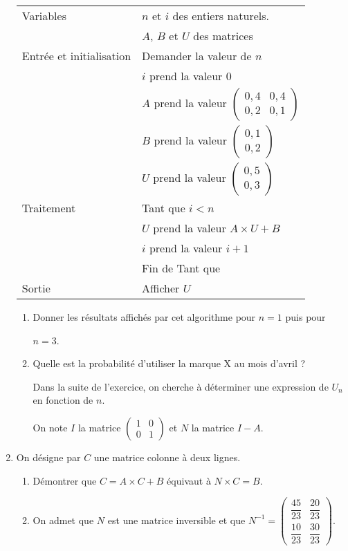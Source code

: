 \documentclass[10pt]{article}
\begin{document}
\begin{enumerate}
\begin{center}
\begin{tabularx}{0.85\linewidth}{|m{4cm}|X|}\hline 
Variables& $n$ et $i$ des entiers naturels.\\
		&$A$, $B$ et $U$ des matrices\\ \hline   
Entrée et initialisation&Demander la valeur de $n$ \\   
		&$i$ prend la valeur $0$\\ 
		&$A$ prend la valeur $\begin{pmatrix}0,4&0,4\\0,2&0,1\end{pmatrix}$\\ 
		&$B$ prend la valeur $\begin{pmatrix}0,1\\0,2\end{pmatrix}$\\ 
		&$U$ prend la valeur $\begin{pmatrix}0,5\\0,3\end{pmatrix}$\\ \hline 
Traitement &Tant que $i < n$\\ 
		&\hspace{0,4cm}$U$ prend la valeur $A \times U + B$\\ 
		&\hspace{0,4cm}$i$ prend la valeur $i + 1$\\
		&Fin de Tant que \\ \hline 
Sortie 	&Afficher $U$\\ \hline
\end{tabularx}
\end{center}  

	\begin{enumerate}
		\item Donner les résultats affichés par cet algorithme pour $n = 1$ puis pour 
		
		$n = 3$. 
		\item Quelle est la probabilité d'utiliser la marque X au mois d'avril ? 

Dans la suite de l'exercice, on cherche à déterminer une expression de $U_{n}$ en fonction de $n$. 

On note $I$ la matrice $\begin{pmatrix}1&0\\0&1\end{pmatrix}$ et $N$ la matrice $I - A$.
	\end{enumerate} 
\item On désigne par $C$ une matrice colonne à deux lignes. 
	\begin{enumerate}
		\item Démontrer que $C = A \times C + B$ équivaut à $N \times C = B$.  
		\item On admet que $N$ est une matrice inversible et que $N^{-1} = \begin{pmatrix}\dfrac{45}{23}&\dfrac{20}{23}\\[8pt]
		\dfrac{10}{23}&\dfrac{30}{23}\end{pmatrix}$. 


\end{enumerate}
\end{enumerate}
\end{document}
